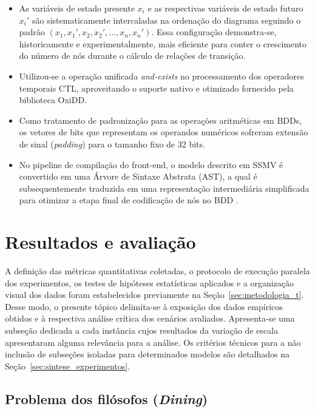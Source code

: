 \documentclass[cic,tc]{infufrgs}
\begin{document}
	\begin{itemize}
		\item As variáveis de estado presente $x_i$ e as respectivas variáveis de estado futuro $x_i'$ são sistematicamente intercaladas na ordenação do diagrama seguindo o padrão $(x_1,x_1', x_2,x_2', \dots, x_n,x_n')$. Essa configuração demonstra-se, historicamente e experimentalmente, mais eficiente para conter o crescimento do número de nós durante o cálculo de relações de transição.
		\item Utilizou-se a operação unificada \textit{and-exists} no processamento dos operadores temporais CTL, aproveitando o suporte nativo e otimizado fornecido pela biblioteca OxiDD.
		\item Como tratamento de padronização para as operações aritméticas em BDDs, os vetores de bits que representam os operandos numéricos sofreram extensão de sinal (\textit{padding}) para o tamanho fixo de 32 bits.
		\item No pipeline de compilação do front-end, o modelo descrito em SSMV é convertido em uma Árvore de Sintaxe Abstrata (AST), a qual é subsequentemente traduzida em uma representação intermediária simplificada para otimizar a etapa final de codificação de nós no BDD \cite{llull}.
	\end{itemize}
	
	\section{Resultados e avaliação}
	\label{sec:resultados_avaliacao}
	
	A definição das métricas quantitativas coletadas, o protocolo de execução paralela dos experimentos, os testes de hipóteses estatísticas aplicados e a organização visual dos dados foram estabelecidos previamente na Seção~\ref{sec:metodologia_t}. Desse modo, o presente tópico delimita-se à exposição dos dados empíricos obtidos e à respectiva análise crítica dos cenários avaliados. Apresenta-se uma subseção dedicada a cada instância cujos resultados da variação de escala apresentaram alguma relevância para a análise. Os critérios técnicos para a não inclusão de subseções isoladas para determinados modelos são detalhados na Seção~\ref{sec:sintese_experimentos}.
	
	\subsection{Problema dos filósofos (\textit{Dining})}
	\label{sec:res_dining}
	
\end{document}

